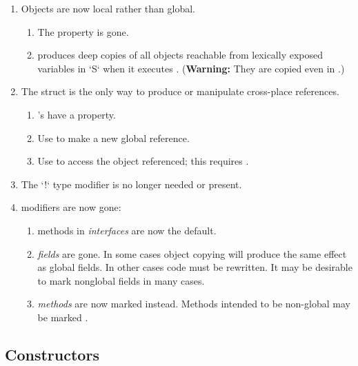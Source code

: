 \begin{enumerate}
\item Objects are now local rather than global.
   
    \begin{enumerate}
    \item The  property is gone.
    \item {} produces deep copies of all objects reachable from
          lexically exposed variables in \xcd`S` 
          when it executes .  ({\bf Warning:} They are copied even in  
          .)
    \end{enumerate}

\item The  struct is the only way to produce or manipulate
      cross-place references.
    \begin{enumerate}
    \item {}'s have a  property.
    \item Use  to make a new global reference.
    \item Use  to access the object referenced; this
          requires . 
    \end{enumerate}


\item  The \xcd`!` type modifier is no longer needed or present.

\item {} modifiers are now gone:
    
    \begin{enumerate}
    \item {} methods in {\em interfaces} are now the default. 
    \item {} {\em fields} are gone.  In some cases object copying
          will produce the same effect as global fields.  In other cases code
          must be rewritten.  It may be desirable to mark nonglobal fields
           in many cases.
    \item {} {\em methods} are now marked  instead.  
          Methods intended to be non-global may be marked .
    \end{enumerate}


\end{enumerate}

\subsection{Constructors}


